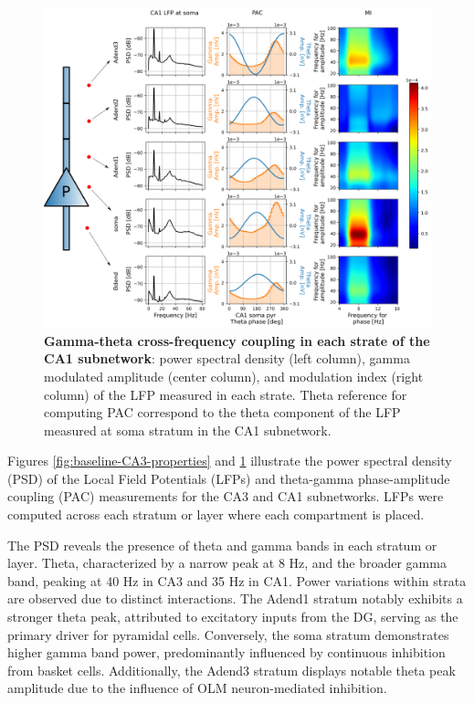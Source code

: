 \documentclass[../main.tex]{subfiles}
\begin{document}
\begin{figure}[t]
    \centering
    \includegraphics[width=\textwidth]{chapter4/figures/baseline_CA1_properties.png}
    \caption{\textbf{Gamma-theta cross-frequency coupling in each strate of the CA1 subnetwork}: power spectral density (left column), gamma modulated amplitude (center column), and modulation index (right column) of the LFP measured in each strate.
    Theta reference for computing PAC correspond to the theta component of the LFP measured at soma stratum in the CA1 subnetwork.}
    \label{fig:baseline-CA1-properties}
\end{figure}
Figures \ref{fig:baseline-CA3-properties} and \ref{fig:baseline-CA1-properties} illustrate the power spectral density (PSD) of the Local Field Potentials (LFPs) and theta-gamma phase-amplitude coupling (PAC) measurements for the CA3 and CA1 subnetworks.
LFPs were computed across each stratum or layer where each compartment is placed.

The PSD reveals the presence of theta and gamma bands in each stratum or layer.
Theta, characterized by a narrow peak at 8 Hz, and the broader gamma band, peaking at 40 Hz in CA3 and 35 Hz in CA1.
Power variations within strata are observed due to distinct interactions.
The Adend1 stratum notably exhibits a stronger theta peak, attributed to excitatory inputs from the DG, serving as the primary driver for pyramidal cells.
Conversely, the soma stratum demonstrates higher gamma band power, predominantly influenced by continuous inhibition from basket cells.
Additionally, the Adend3 stratum displays notable theta peak amplitude due to the influence of OLM neuron-mediated inhibition.
\end{document}
